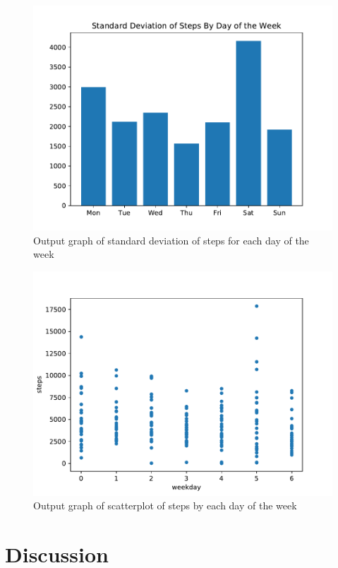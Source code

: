 \documentclass[sigconf]{acmart}
\begin{document}
\begin{figure}[htb]
\includegraphics[width=1.0\columnwidth]{images/Client1StDevStepsByDayOfWeek.pdf}
\caption{Output graph of standard deviation of steps for each day of the week}
\end{figure}

\begin{figure}[htb]
\includegraphics[width=1.0\columnwidth]{images/Client1ScatterplotOfStepsByDayOfWeek.pdf}
\caption{Output graph of scatterplot of steps by each day of the week}
\end{figure}

\section{Discussion}
\end{document}
